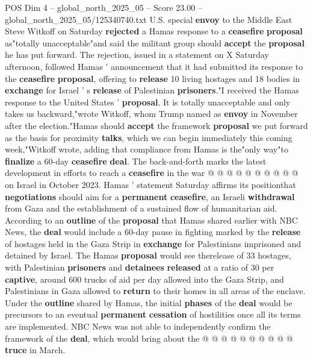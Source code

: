 \begin{textsample}{POS Dim 4 – global\_north\_2025\_05 – Score 23.00 – global\_north\_2025\_05/125340740.txt}  \label{ex:f4_pos_218}
U.S. special \textbf{envoy} to the Middle East Steve Witkoff on Saturday \textbf{rejected} a Hamas response to a \textbf{ceasefire} \textbf{proposal} as"totally unacceptable"and said the militant group should \textbf{accept} the \textbf{proposal} he has put forward.
The rejection, issued in a statement on X Saturday afternoon, followed Hamas ' announcement that it had submitted its response to the \textbf{ceasefire} \textbf{proposal}, offering to \textbf{release} 10 living hostages and 18 bodies in \textbf{exchange} for Israel ' s \textbf{release} of Palestinian \textbf{prisoners}."I received the Hamas response to the United States ' \textbf{proposal}.
It is totally unacceptable and only takes us backward,"wrote Witkoff, whom Trump named as \textbf{envoy} in November after the election."Hamas should \textbf{accept} the framework \textbf{proposal} we put forward as the basis for proximity \textbf{talks}, which we can begin immediately this coming week,"Witkoff wrote, adding that compliance from Hamas is the"only way"to \textbf{finalize} a 60-day \textbf{ceasefire} \textbf{deal}.
The back-and-forth marks the latest development in efforts to reach a \textbf{ceasefire} in the war @ @ @ @ @ @ @ @ @ @ on Israel in October 2023.
Hamas ' statement Saturday affirms its positionthat \textbf{negotiations} should aim for a \textbf{permanent} \textbf{ceasefire}, an Israeli \textbf{withdrawal} from Gaza and the establishment of a sustained flow of humanitarian aid.
According to an \textbf{outline} of the \textbf{proposal} that Hamas shared earlier with NBC News, the \textbf{deal} would include a 60-day pause in fighting marked by the \textbf{release} of hostages held in the Gaza Strip in \textbf{exchange} for Palestinians imprisoned and detained by Israel.
The Hamas \textbf{proposal} would see therelease of 33 hostages, with Palestinian \textbf{prisoners} and \textbf{detainees} \textbf{released} at a ratio of 30 per \textbf{captive}, around 600 trucks of aid per day allowed into the Gaza Strip, and Palestinians in Gaza allowed to \textbf{return} to their homes in all areas of the enclave.
Under the \textbf{outline} shared by Hamas, the initial \textbf{phases} of the \textbf{deal} would be precursors to an eventual \textbf{permanent} \textbf{cessation} of hostilities once all its terms are implemented.
NBC News was not able to independently confirm the framework of the \textbf{deal}, which would bring about the @ @ @ @ @ @ @ @ @ @ \textbf{truce} in March.

\end{textsample}
